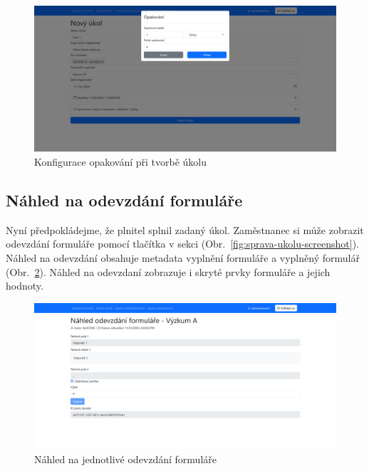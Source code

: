 \begin{figure}[H]
    \centering
    \includegraphics[width=\textwidth]{../img/screenshots/tvorba-ukolu-opakovani}
    \caption{Konfigurace opakování při tvorbě úkolu}\label{fig:tvorba-ukolu-opakovani-screenshot}
\end{figure}

\subsection{Náhled na odevzdání formuláře}\label{subsec:nahled-odevzdani-formulare}

Nyní předpokládejme, že plnitel splnil zadaný úkol.
Zaměstnanec si může zobrazit odevzdání formuláře pomocí tlačítka  v sekci  (Obr.~\ref{fig:sprava-ukolu-screenshot}).
Náhled na odevzdání obsahuje metadata vyplnění formuláře a vyplněný formulář (Obr.~\ref{fig:nahled-odevzdani-zamestnanec-screenshot}).
Náhled na odevzdaní zobrazuje i skryté prvky formuláře a jejich hodnoty.

\begin{figure}[H]
    \centering
    \includegraphics[width=\textwidth]{../img/screenshots/nahled-odevzdani-zamestnanec}
    \caption{Náhled na jednotlivé odevzdání formuláře}\label{fig:nahled-odevzdani-zamestnanec-screenshot}
\end{figure}


